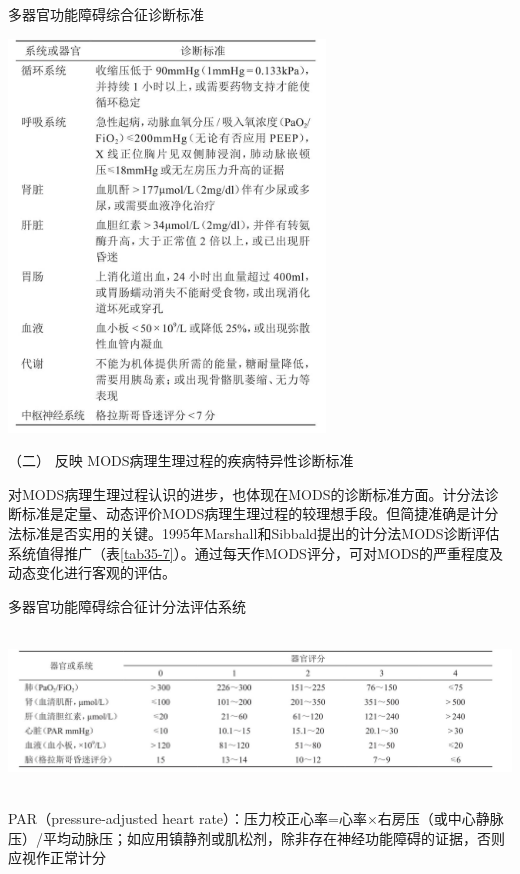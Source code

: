 \begin{table}[htbp]
\centering
\caption{多器官功能障碍综合征诊断标准}
\label{tab35-6}
\includegraphics[width=3.3125in,height=4.10417in]{./images/Image00138.jpg}
\end{table}

\hypertarget{text00094.htmlux5cux23CHP3-11-3-3-2}{}
（二） 反映 MODS病理生理过程的疾病特异性诊断标准

对MODS病理生理过程认识的进步，也体现在MODS的诊断标准方面。计分法诊断标准是定量、动态评价MODS病理生理过程的较理想手段。但简捷准确是计分法标准是否实用的关键。1995年Marshall和Sibbald提出的计分法MODS诊断评估系统值得推广（表\ref{tab35-7}）。通过每天作MODS评分，可对MODS的严重程度及动态变化进行客观的评估。

\begin{table}[htbp]
\centering
\caption{多器官功能障碍综合征计分法评估系统}
\label{tab35-7}
\includegraphics[width=6.86458in,height=1.66667in]{./images/Image00139.jpg}
\end{table}

PAR（pressure-adjusted heart
rate）：压力校正心率=心率×右房压（或中心静脉压）/平均动脉压；如应用镇静剂或肌松剂，除非存在神经功能障碍的证据，否则应视作正常计分

